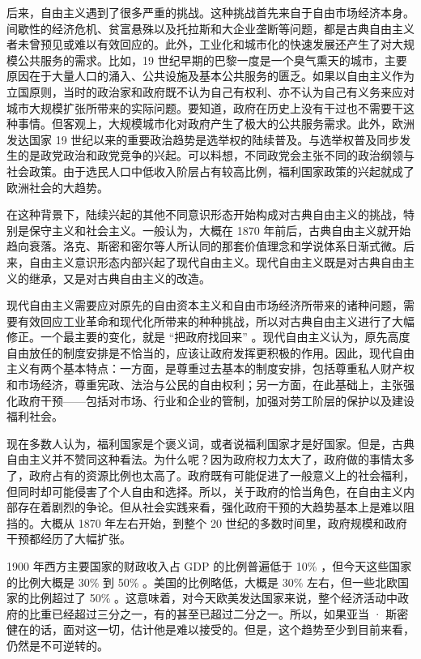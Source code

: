 
后来，自由主义遇到了很多严重的挑战。这种挑战首先来自于自由市场经济本身。间歇性的经济危机、贫富悬殊以及托拉斯和大企业垄断等问题，都是古典自由主义者未曾预见或难以有效回应的。此外，工业化和城市化的快速发展还产生了对大规模公共服务的需求。比如，19 世纪早期的巴黎一度是一个臭气熏天的城市，主要原因在于大量人口的涌入、公共设施及基本公共服务的匮乏。如果以自由主义作为立国原则，当时的政治家和政府既不认为自己有权利、亦不认为自己有义务来应对城市大规模扩张所带来的实际问题。要知道，政府在历史上没有干过也不需要干这种事情。但客观上，大规模城市化对政府产生了极大的公共服务需求。此外，欧洲发达国家 19 世纪以来的重要政治趋势是选举权的陆续普及。与选举权普及同步发生的是政党政治和政党竞争的兴起。可以料想，不同政党会主张不同的政治纲领与社会政策。由于选民人口中低收入阶层占有较高比例，福利国家政策的兴起就成了欧洲社会的大趋势。

在这种背景下，陆续兴起的其他不同意识形态开始构成对古典自由主义的挑战，特别是保守主义和社会主义。一般认为，大概在 1870 年前后，古典自由主义就开始趋向衰落。洛克、斯密和密尔等人所认同的那套价值理念和学说体系日渐式微。后来，自由主义意识形态内部兴起了现代自由主义。现代自由主义既是对古典自由主义的继承，又是对古典自由主义的改造。

现代自由主义需要应对原先的自由资本主义和自由市场经济所带来的诸种问题，需要有效回应工业革命和现代化所带来的种种挑战，所以对古典自由主义进行了大幅修正。一个最主要的变化，就是 “把政府找回来” 。现代自由主义认为，原先高度自由放任的制度安排是不恰当的，应该让政府发挥更积极的作用。因此，现代自由主义有两个基本特点：一方面，是尊重过去基本的制度安排，包括尊重私人财产权和市场经济，尊重宪政、法治与公民的自由权利；另一方面，在此基础上，主张强化政府干预——包括对市场、行业和企业的管制，加强对劳工阶层的保护以及建设福利社会。

现在多数人认为，福利国家是个褒义词，或者说福利国家才是好国家。但是，古典自由主义并不赞同这种看法。为什么呢？因为政府权力太大了，政府做的事情太多了，政府占有的资源比例也太高了。政府既有可能促进了一般意义上的社会福利，但同时却可能侵害了个人自由和选择。所以，关于政府的恰当角色，在自由主义内部存在着剧烈的争论。但从社会实践来看，强化政府干预的大趋势基本上是难以阻挡的。大概从 1870 年左右开始，到整个 20 世纪的多数时间里，政府规模和政府干预都经历了大幅扩张。

1900 年西方主要国家的财政收入占 GDP 的比例普遍低于 10\% ，但今天这些国家的比例大概是 30\% 到 50\% 。美国的比例略低，大概是 30\% 左右，但一些北欧国家的比例超过了 50\% 。这意味着，对今天欧美发达国家来说，整个经济活动中政府的比重已经超过三分之一，有的甚至已超过二分之一。所以，如果亚当 · 斯密健在的话，面对这一切，估计他是难以接受的。但是，这个趋势至少到目前来看，仍然是不可逆转的。

